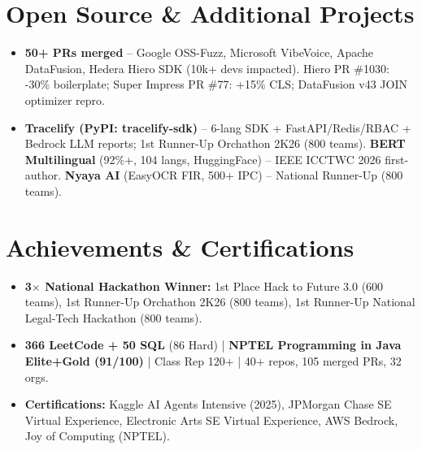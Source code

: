 \documentclass[letterpaper,10pt]{article}
\begin{document}
\section{Open Source \& Additional Projects}
\begin{itemize}[leftmargin=0.15in, label={}, itemsep=1pt]
  \item\small{\textbf{50+ PRs merged} -- Google OSS-Fuzz, Microsoft VibeVoice, Apache DataFusion, Hedera Hiero SDK (10k+ devs impacted). Hiero PR \#1030: -30\% boilerplate; Super Impress PR \#77: +15\% CLS; DataFusion v43 JOIN optimizer repro.}
  \item\small{\textbf{Tracelify (PyPI: tracelify-sdk)} -- 6-lang SDK + FastAPI/Redis/RBAC + Bedrock LLM reports; 1st Runner-Up Orchathon 2K26 (800 teams). \textbf{BERT Multilingual} (92\%+, 104 langs, HuggingFace) -- IEEE ICCTWC 2026 first-author. \textbf{Nyaya AI} (EasyOCR FIR, 500+ IPC) -- National Runner-Up (800 teams).}
\end{itemize}

\section{Achievements \& Certifications}
\begin{itemize}[leftmargin=0.15in, label={}, itemsep=1pt]
  \item\small{\textbf{3$\times$ National Hackathon Winner:} 1st Place Hack to Future 3.0 (600 teams), 1st Runner-Up Orchathon 2K26 (800 teams), 1st Runner-Up National Legal-Tech Hackathon (800 teams).}
  \item\small{\textbf{366 LeetCode + 50 SQL} (86 Hard) | \textbf{NPTEL Programming in Java Elite+Gold (91/100)} | Class Rep 120+ | 40+ repos, 105 merged PRs, 32 orgs.}
  \item\small{\textbf{Certifications:} Kaggle AI Agents Intensive (2025), JPMorgan Chase SE Virtual Experience, Electronic Arts SE Virtual Experience, AWS Bedrock, Joy of Computing (NPTEL).}
\end{itemize}
\end{document}
